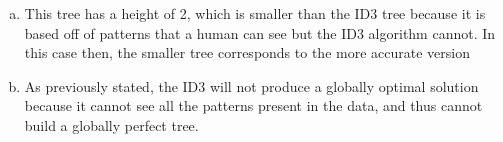 \documentclass[12pt]{article}%
\begin{document}
\begin{enumerate}[a.]
\begin{center}
        \end{center}
        \item
        This tree has a height of 2, which is smaller than the ID3 tree because it is based off of patterns that a human can see but the ID3 algorithm cannot. In this case then, the smaller tree corresponds to the more accurate version
        \item
        As previously stated, the ID3 will not produce a globally optimal solution because it cannot see all the patterns present in the data, and thus cannot build a globally perfect tree.
    \end{enumerate}
\end{document}
